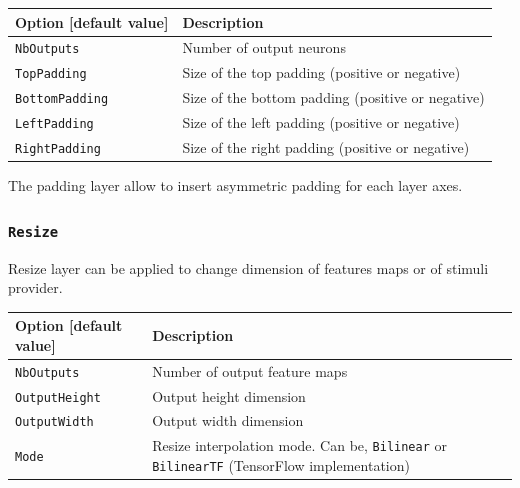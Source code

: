 \documentclass[a4paper,11pt,oneside]{article}
\begin{document}
\begin{center}
 \begin{longtable}{| p{5cm} | p{10cm} | }
 \hline
 Option [default value] & Description\\
 \hline\hline
  \cellcolor{requiredcolor}\lstinline!NbOutputs! & Number of output neurons \\
  \cellcolor{requiredcolor}\lstinline!TopPadding! & Size of the top padding (positive or negative) \\
  \cellcolor{requiredcolor}\lstinline!BottomPadding! & Size of the bottom padding (positive or negative) \\
  \cellcolor{requiredcolor}\lstinline!LeftPadding! & Size of the left padding (positive or negative) \\
  \cellcolor{requiredcolor}\lstinline!RightPadding! & Size of the right padding (positive or negative) \\
  \hline
\end{longtable}
\end{center}

The padding layer allow to insert asymmetric padding for each layer axes. \\

\subsubsection{\texorpdfstring{%
\lstinline[basicstyle=\ttfamily\bfseries]!Resize!}{Resize}}
Resize layer can be applied to change dimension of features maps or of stimuli provider.

\begin{center}
 \begin{longtable}{| p{5cm} | p{10cm} | }
 \hline
 Option [default value] & Description\\
 \hline\hline
  \cellcolor{requiredcolor}\lstinline!NbOutputs! & Number of output feature maps \\
  \cellcolor{requiredcolor}\lstinline!OutputHeight! & Output height dimension \\
  \cellcolor{requiredcolor}\lstinline!OutputWidth! & Output width dimension \\
  \cellcolor{requiredcolor}\lstinline!Mode! & Resize interpolation mode. Can be,
  \lstinline!Bilinear! or \lstinline!BilinearTF! (TensorFlow implementation)\\
  \hline
\end{longtable}
\end{center}
\end{document}
